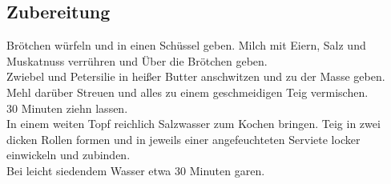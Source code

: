 \documentclass{article}
\begin{document}
  \subsection*{Zubereitung}
  \label{sub:serviettenknoedel:zubereitung}
	Brötchen würfeln und in einen Schüssel geben.
	Milch mit Eiern, Salz und Muskatnuss verrühren und
	Über die Brötchen geben.\\
	Zwiebel und Petersilie in heißer Butter anschwitzen und
	zu der Masse geben.
	Mehl darüber Streuen und
	alles zu einem geschmeidigen Teig vermischen.\\
	30 Minuten ziehn lassen.\\
	In einem weiten Topf reichlich Salzwasser zum Kochen bringen.
	Teig in zwei dicken Rollen formen und
	in jeweils einer angefeuchteten Serviete locker einwickeln und
	zubinden.\\
	Bei leicht siedendem Wasser etwa 30 Minuten garen.
\end{document}
